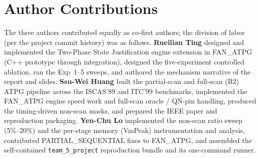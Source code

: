 \documentclass[conference]{IEEEtran}
\begin{document}
\section*{Author Contributions}
The three authors contributed equally as co-first authors; the division of
labor (per the project commit history) was as follows.
\textbf{Rueilian Ting} designed and implemented the Two-Phase State
Justification engine extension in FAN\_ATPG (C++ prototype through integration),
designed the five-experiment controlled ablation, ran the Exp~1--5 sweeps, and
authored the mechanism narrative of the report and slides.
\textbf{Ssu-Wei Huang} built the partial-scan and full-scan (B2) ATPG pipeline
across the ISCAS'89 and ITC'99 benchmarks, implemented the FAN\_ATPG engine
speed work and full-scan oracle / QN-pin handling, produced the timing-driven
non-scan masks, and prepared the IEEE paper and reproduction packaging.
\textbf{Yen-Chu Lo} implemented the non-scan ratio sweep (5\%--20\%) and the
per-stage memory (VmPeak) instrumentation and analysis, contributed
PARTIAL\_SEQUENTIAL fixes to FAN\_ATPG, and assembled the self-contained
\texttt{team\_5\_project} reproduction bundle and its one-command runner.
\end{document}
